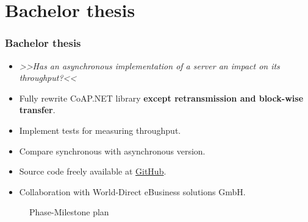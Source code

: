 \documentclass[11pt,t,usepdftitle=false,aspectratio=169,usenames,dvipsnames]{beamer}
\begin{document}
    \section{Bachelor thesis}
    \begin{frame}
        \frametitle{Bachelor thesis}

        \begin{itemize}
            \item<1-> \textcolor{uibkblue}{\textit{>>Has an asynchronous implementation of a server an impact on its throughput?<<}}
            \item<2-> Fully rewrite CoAP.NET library \textbf{\textcolor{uibkblue}{except retransmission and block-wise transfer}}. 
            \item<4-> Implement tests for measuring throughput.
            \item<5-> Compare synchronous with asynchronous version.
            \item<6-> Source code freely available at \href{https://github.com/world-direct/CoAP.NET}{GitHub}.
            \item<7-> Collaboration with World-Direct eBusiness solutions GmbH.
        \end{itemize}
        \begin{figure}[ht]
            \caption{Phase-Milestone plan}
            \label{figure:phase-milestone-plan}
        \end{figure}
    \end{frame}
\end{document}
